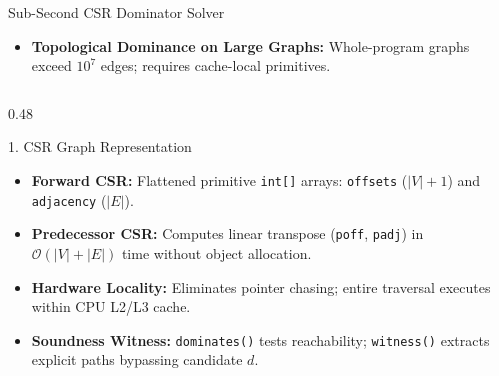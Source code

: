 \documentclass[11pt]{beamer}
\begin{document}
\begin{frame}[fragile]{Sub-Second CSR Dominator Solver}
  \vspace{-0.3em}
  \begin{itemize}\setlength{\itemsep}{1pt}
    \item \textbf{Topological Dominance on Large Graphs:} Whole-program graphs exceed $10^7$ edges; requires cache-local primitives.
  \end{itemize}
  \vspace{-0.4em}

  \begin{columns}[T]
    \begin{column}{0.48\textwidth}
      \begin{block}{1. CSR Graph Representation}
        \scriptsize
        \begin{itemize}\setlength{\itemsep}{1.5pt}
          \item \textbf{Forward CSR:} Flattened primitive \texttt{int[]} arrays: \texttt{offsets} ($|V|+1$) and \texttt{adjacency} ($|E|$).
          \item \textbf{Predecessor CSR:} Computes linear transpose (\texttt{poff}, \texttt{padj}) in $\mathcal{O}(|V| + |E|)$ time without object allocation.
          \item \textbf{Hardware Locality:} Eliminates pointer chasing; entire traversal executes within CPU L2/L3 cache.
          \item \textbf{Soundness Witness:} \texttt{dominates()} tests reachability; \texttt{witness()} extracts explicit paths bypassing candidate $d$.
        \end{itemize}
      \end{block}
    \end{column}


\end{columns}
\end{frame}
\end{document}

